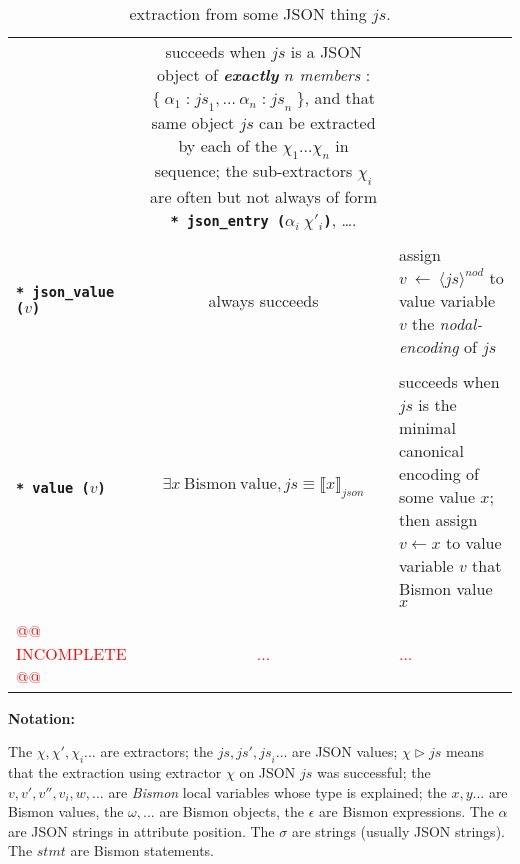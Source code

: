 \begin{table}[!htbp]
\begin{relsize}{-1.2}
\begin{center}
\begin{tabular}{lcp{5.7cm}}
      &
      succeeds when $\mathit{js}$ is a JSON object of
      \emph{\textbf{exactly} $n$ members} : $\mathtt{\textbf{\{}} \;
      \alpha_1 \; \mathtt{\textbf{:}} \; \mathit{js}_1, \ldots ~
      \alpha_n \; \mathtt{\textbf{:}} \;\mathit{js}_n \;
      \mathtt{\textbf{\}}}$, and that same object $\mathit{js}$ can be
      extracted by each of the $\chi_1 \ldots \chi_n$ in sequence; the
      sub-extractors $\chi_i$ are often but not always of form
      \texttt{\textbf{* json\_entry ($\alpha_i ~ \chi'_i$)}}, \ldots. \\
      \rule{0pt}{1ex} \\ 
      \texttt{\textbf{* json\_value ($v$)}} &
      always succeeds &
      assign  $v ~ \leftarrow ~ \langle \mathit{js} \rangle^{nod}$ to value variable $v$ the \emph{nodal-encoding} of $js$ \\
      \rule{0pt}{1ex} \\    
      \texttt{\textbf{* value ($v$)}} &
      $\exists x ~ \mathrm{Bismon ~ value}, js \equiv  \llbracket x \rrbracket_{json}$  &
      succeeds when $js$ is the minimal canonical encoding of some value $x$;
      then assign $v \leftarrow x$ to value variable $v$ that Bismon value $x$ \\
      \rule{0pt}{1ex} \\       
      {\textcolor{red}{@@ INCOMPLETE @@}} & {\textcolor{red}{...}} & {\textcolor{red}{...}} \\
    \end{tabular}
  \end{center}
  \bigskip
  \textbf{Notation:} \hspace{0.6em} \begin{minipage}{0.9\textwidth}
    The $\chi, \chi', \chi_i$... are extractors; the $\mathit{js},
    \mathit{js}', \mathit{js}_i$... are JSON values; $\chi
    \triangleright \mathit{js}$ means that the extraction using
    extractor $\chi$ on JSON $ \mathit{js}$ was successful; the $v,
    v', v'', v_i, w, $... are \emph{Bismon} local variables whose type
    is explained; the $x, y$... are Bismon values, the
    $\omega,$... are Bismon objects, the $\epsilon$ are Bismon expressions. The $\alpha$ are JSON strings in
    attribute position. The $\sigma$ are strings (usually JSON
    strings). The $\mathit{stmt}$ are Bismon statements.
  \end{minipage}
  \end{relsize}
  \caption{extraction from some JSON thing $\mathit{js}$.}
  \label{tbl:extract-json}
  \end{table}
  
